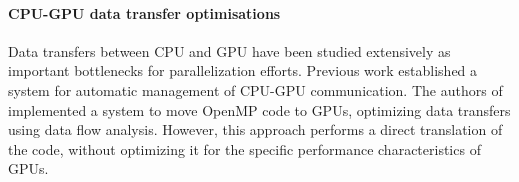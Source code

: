 \paragraph*{CPU-GPU data transfer optimisations}

    Data transfers between CPU and GPU have been studied extensively as
    important bottlenecks for parallelization efforts.
    Previous work \cite{Jablin:2011:ACC:1993316.1993516} established a system
    for automatic management of CPU-GPU communication.
    The authors of \cite{Lee:2009:OGC:1594835.1504194} implemented a system to
    move OpenMP code to GPUs, optimizing data transfers using data flow
    analysis.
    However, this approach performs a direct translation of the code, without
    optimizing it for the specific performance characteristics of GPUs.


